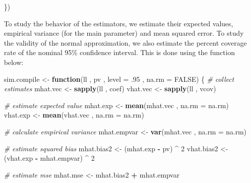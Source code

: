 \documentclass[
]{book}
\newenvironment{Shaded}{\begin{snugshade}}{\end{snugshade}}
\newcommand{\AttributeTok}[1]{\textcolor[rgb]{0.13,0.29,0.53}{#1}}
\newcommand{\CommentTok}[1]{\textcolor[rgb]{0.56,0.35,0.01}{\textit{#1}}}
\newcommand{\ConstantTok}[1]{\textcolor[rgb]{0.56,0.35,0.01}{#1}}
\newcommand{\ControlFlowTok}[1]{\textcolor[rgb]{0.13,0.29,0.53}{\textbf{#1}}}
\newcommand{\DecValTok}[1]{\textcolor[rgb]{0.00,0.00,0.81}{#1}}
\newcommand{\FunctionTok}[1]{\textcolor[rgb]{0.13,0.29,0.53}{\textbf{#1}}}
\newcommand{\NormalTok}[1]{#1}
\newcommand{\OtherTok}[1]{\textcolor[rgb]{0.56,0.35,0.01}{#1}}
\newcommand{\SpecialCharTok}[1]{\textcolor[rgb]{0.81,0.36,0.00}{\textbf{#1}}}
\begin{document}
\begin{Shaded}
\begin{Highlighting}[]
\NormalTok{\})}
\end{Highlighting}
\end{Shaded}

To study the behavior of the estimators, we estimate their expected values, empirical
variance (for the main parameter) and mean squared error. To study the validity
of the normal approximation, we also estimate the percent coverage rate of the nominal
95\% confidence interval. This is done using the function below:

\begin{Shaded}
\begin{Highlighting}[]
\NormalTok{sim.compile }\OtherTok{\textless{}{-}} \ControlFlowTok{function}\NormalTok{(ll ,}
\NormalTok{                        pv ,}
                        \AttributeTok{level =}\NormalTok{ .}\DecValTok{95}\NormalTok{ ,}
                        \AttributeTok{na.rm =} \ConstantTok{FALSE}\NormalTok{) \{}
  \CommentTok{\# collect estimates}
\NormalTok{  mhat.vec }\OtherTok{\textless{}{-}} \FunctionTok{sapply}\NormalTok{(ll , coef)}
\NormalTok{  vhat.vec }\OtherTok{\textless{}{-}} \FunctionTok{sapply}\NormalTok{(ll , vcov)}
  
  \CommentTok{\# estimate expected value}
\NormalTok{  mhat.exp }\OtherTok{\textless{}{-}} \FunctionTok{mean}\NormalTok{(mhat.vec , }\AttributeTok{na.rm =}\NormalTok{ na.rm)}
\NormalTok{  vhat.exp }\OtherTok{\textless{}{-}} \FunctionTok{mean}\NormalTok{(vhat.vec , }\AttributeTok{na.rm =}\NormalTok{ na.rm)}
  
  \CommentTok{\# calculate empirical variance}
\NormalTok{  mhat.empvar }\OtherTok{\textless{}{-}} \FunctionTok{var}\NormalTok{(mhat.vec , }\AttributeTok{na.rm =}\NormalTok{ na.rm)}
  
  \CommentTok{\# estimate squared bias}
\NormalTok{  mhat.bias2 }\OtherTok{\textless{}{-}}\NormalTok{ (mhat.exp }\SpecialCharTok{{-}}\NormalTok{ pv) }\SpecialCharTok{\^{}} \DecValTok{2}
\NormalTok{  vhat.bias2 }\OtherTok{\textless{}{-}}\NormalTok{ (vhat.exp }\SpecialCharTok{{-}}\NormalTok{ mhat.empvar) }\SpecialCharTok{\^{}} \DecValTok{2}
  
  \CommentTok{\# estimate mse}
\NormalTok{  mhat.mse }\OtherTok{\textless{}{-}}\NormalTok{ mhat.bias2 }\SpecialCharTok{+}\NormalTok{ mhat.empvar}
  

\end{Highlighting}
\end{Shaded}
\end{document}
